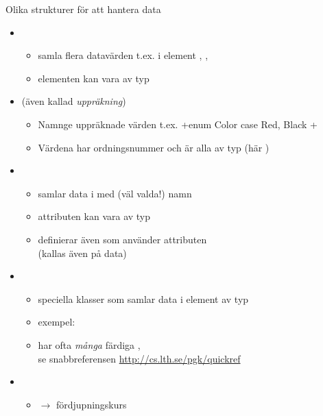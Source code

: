 \begin{Slide}{Olika strukturer för att hantera data}
\begin{itemize}\SlideFontSmall
\item {} 
\begin{itemize}\SlideFontTiny
\item samla flera datavärden t.ex.  i element , ,  
\item elementen kan vara av  typ
\end{itemize}
\item {} (även kallad \emph{uppräkning}) 
\begin{itemize}\SlideFontTiny
\item Namnge uppräknade värden t.ex. \code+enum Color { case Red, Black }+
\item Värdena har ordningsnummer och är alla av  typ (här )
\end{itemize}
\item {} 
\begin{itemize}\SlideFontTiny
\item samlar data i  med (väl valda!) namn
\item attributen kan vara av  typ
\item definierar även  som använder attributen \\ (kallas även  på data)
\end{itemize}

\item {}
  \begin{itemize}
  \item speciella klasser som samlar data i element av  typ
  \item exempel: 
  \item har ofta \emph{många} färdiga , \\ se snabbreferensen \url{http://cs.lth.se/pgk/quickref}
  \end{itemize}

\item {}
  \begin{itemize}
  \item $\rightarrow$ fördjupningskurs
  \end{itemize}

\end{itemize}
\end{Slide}





